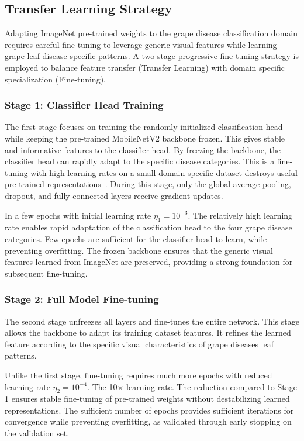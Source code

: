 \subsection{Transfer Learning Strategy}

Adapting ImageNet pre-trained weights to the grape disease classification domain requires careful fine-tuning to leverage generic visual features while learning grape leaf disease specific patterns. A two-stage progressive fine-tuning strategy is employed to balance feature transfer (Transfer Learning) with domain specific specialization (Fine-tuning).

\subsubsection{Stage 1: Classifier Head Training}

The first stage focuses on training the randomly initialized classification head while keeping the pre-trained MobileNetV2 backbone frozen. This gives stable and informative features to the classifier head. By freezing the backbone, the classifier head can rapidly adapt to the specific disease categories. This is  a fine-tuning with high learning rates on a small domain-specific dataset destroys useful pre-trained representations~\cite{yosinski2014transferable}. During this stage, only the global average pooling, dropout, and fully connected layers receive gradient updates.

In a few epochs with initial learning rate $\eta_1 = 10^{-3}$. The relatively high learning rate enables rapid adaptation of the classification head to the four grape disease categories. Few epochs are sufficient for the classifier head to learn, while preventing overfitting. The frozen backbone ensures that the generic visual features learned from ImageNet are preserved, providing a strong foundation for subsequent fine-tuning.

\subsubsection{Stage 2: Full Model Fine-tuning}

The second stage unfreezes all layers and fine-tunes the entire network. This stage allows the backbone to adapt its training dataset features. It refines the learned feature according to the specific visual characteristics of grape diseases leaf patterns.

Unlike the first stage, fine-tuning requires much more epochs with reduced learning rate $\eta_2 = 10^{-4}$. The 10$\times$ learning rate. The reduction compared to Stage 1 ensures stable fine-tuning of pre-trained weights without destabilizing learned representations. The sufficient number of epochs provides sufficient iterations for convergence while preventing overfitting, as validated through early stopping on the validation set.


